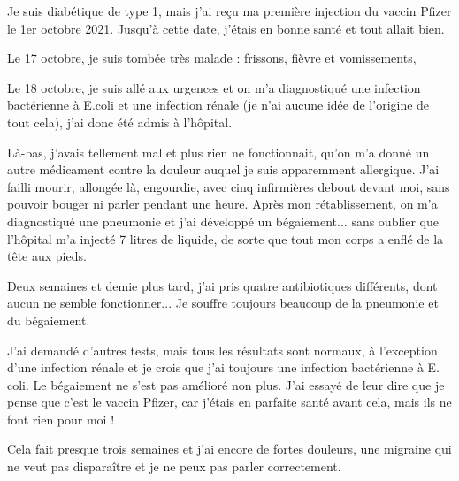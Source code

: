 Je suis diabétique de type 1, mais j'ai reçu ma première injection du vaccin
Pfizer le 1er octobre 2021. Jusqu'à cette date, j'étais en bonne santé et tout
allait bien.

Le 17 octobre, je suis tombée très malade : frissons, fièvre et vomissements,

Le 18 octobre, je suis allé aux urgences et on m'a diagnostiqué une infection
bactérienne à E.coli et une infection rénale (je n'ai aucune idée de l'origine
de tout cela), j'ai donc été admis à l'hôpital.

Là-bas, j'avais tellement mal et plus rien ne fonctionnait, qu'on m'a donné un
autre médicament contre la douleur auquel je suis apparemment allergique. J'ai
failli mourir, allongée là, engourdie, avec cinq infirmières debout devant moi,
sans pouvoir bouger ni parler pendant une heure. Après mon rétablissement, on
m'a diagnostiqué une pneumonie et j'ai développé un bégaiement... sans oublier
que l'hôpital m'a injecté 7 litres de liquide, de sorte que tout mon corps a
enflé de la tête aux pieds.

Deux semaines et demie plus tard, j'ai pris quatre antibiotiques différents,
dont aucun ne semble fonctionner... Je souffre toujours beaucoup de la pneumonie
et du bégaiement.

J'ai demandé d'autres tests, mais tous les résultats sont normaux, à l'exception
d'une infection rénale et je crois que j'ai toujours une infection bactérienne à
E. coli. Le bégaiement ne s'est pas amélioré non plus. J'ai essayé de leur dire
que je pense que c'est le vaccin Pfizer, car j'étais en parfaite santé avant
cela, mais ils ne font rien pour moi !

Cela fait presque trois semaines et j'ai encore de fortes douleurs, une migraine
qui ne veut pas disparaître et je ne peux pas parler correctement.
